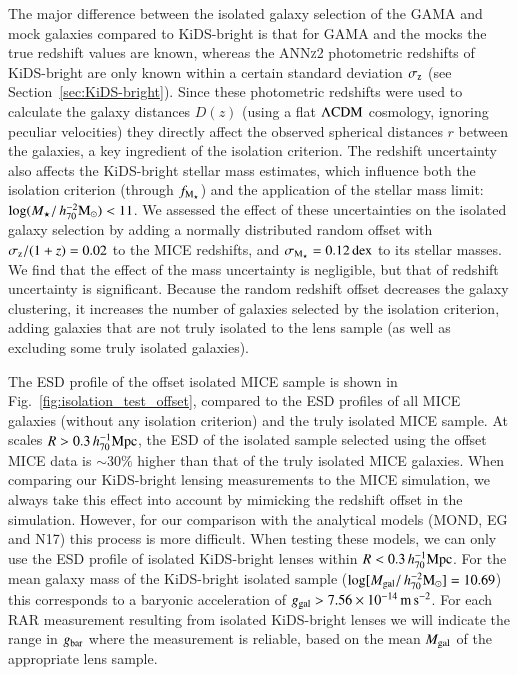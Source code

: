 \documentclass{aa}
\newcommand{\hmsun}{\,h_{70}^{-2} {\rm M_\odot}}
\newcommand{\hMpc}{\,h_{70}^{-1}{\rm{Mpc}} }
\newcommand{\mpss}{\,{\rm m}\,{\rm s}^{-2} }
\newcommand{\dex}{\,{\rm dex}}
\newcommand{\lcdm}{{\rm \Lambda CDM}}
\newcommand*{\E}[1]{\times 10^{#1}}
\newcommand{\un}[1]{_{\rm #1}}
\begin{document}
The major difference between the isolated galaxy selection of the GAMA and mock galaxies compared to KiDS-bright is that for GAMA and the mocks the true redshift values are known, whereas the \textsc{ANNz2} photometric redshifts of KiDS-bright are only known within a certain standard deviation $\sigma\un{z}$ (see Section~\ref{sec:KiDS-bright}). Since these photometric redshifts were used to calculate the galaxy distances $D(z)$ (using a flat $\lcdm$ cosmology, ignoring peculiar velocities) they directly affect the observed spherical distances $r$ between the galaxies, a key ingredient of the isolation criterion. The redshift uncertainty also affects the KiDS-bright stellar mass estimates, which influence both the isolation criterion (through $f\un{M_\star}$) and the application of the stellar mass limit: $\log(M_\star/\hmsun) < 11$. We assessed the effect of these uncertainties on the isolated galaxy selection by adding a normally distributed random offset with $\sigma\un{z}/(1+z) = 0.02$ to the MICE redshifts, and $\sigma\un{M_\star} = 0.12 \dex$ to its stellar masses. We find that the effect of the mass uncertainty is negligible, but that of redshift uncertainty is significant. Because the random redshift offset decreases the galaxy clustering, it increases the number of galaxies selected by the isolation criterion, adding galaxies that are not truly isolated to the lens sample (as well as excluding some truly isolated galaxies).

The ESD profile of the offset isolated MICE sample is shown in Fig.~\ref{fig:isolation_test_offset}, compared to the ESD profiles of all MICE galaxies (without any isolation criterion) and the truly isolated MICE sample. At scales $R > 0.3 \hMpc$, the ESD of the isolated sample selected using the offset MICE data is $\sim 30\%$ higher than that of the truly isolated MICE galaxies. When comparing our KiDS-bright lensing measurements to the MICE simulation, we always take this effect into account by mimicking the redshift offset in the simulation. However, for our comparison with the analytical models (MOND, EG and N17) this process is more difficult. When testing these models, we can only use the ESD profile of isolated KiDS-bright lenses within $R < 0.3 \hMpc$. For the mean galaxy mass of the KiDS-bright isolated sample ($\log[M\un{gal}/\hmsun] = 10.69$) this corresponds to a baryonic acceleration of $g\un{gal}>7.56\E{-14} \mpss$. For each RAR measurement resulting from isolated KiDS-bright lenses we will indicate the range in $g\un{bar}$ where the measurement is reliable, based on the mean $M\un{gal}$ of the appropriate lens sample.
\end{document}
